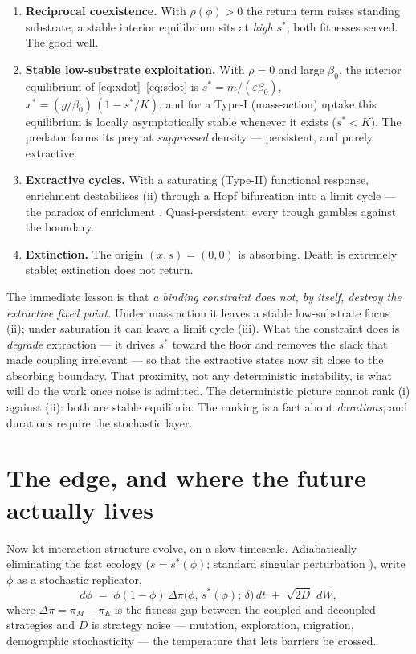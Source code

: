 \documentclass[11pt]{article}
\theoremstyle{plain}
\theoremstyle{definition}
\begin{document}
\begin{enumerate}[label=(\roman*)]
\item \textbf{Reciprocal coexistence.} With $\rho(\phi) > 0$ the return term raises standing substrate; a stable interior equilibrium sits at \emph{high} $s^\ast$, both fitnesses served. The good well.
\item \textbf{Stable low-substrate exploitation.} With $\rho = 0$ and large $\beta_0$, the interior equilibrium of \eqref{eq:xdot}--\eqref{eq:sdot} is $s^\ast = m/(\varepsilon\beta_0)$, $x^\ast = (g/\beta_0)\,(1 - s^\ast/K)$, and for a Type-I (mass-action) uptake this equilibrium is locally asymptotically stable whenever it exists ($s^\ast < K$). The predator farms its prey at \emph{suppressed} density --- persistent, and purely extractive.
\item \textbf{Extractive cycles.} With a saturating (Type-II) functional response, enrichment destabilises (ii) through a Hopf bifurcation into a limit cycle --- the paradox of enrichment \cite{rosenzweig1971}. Quasi-persistent: every trough gambles against the boundary.
\item \textbf{Extinction.} The origin $(x,s) = (0,0)$ is absorbing. Death is extremely stable; extinction does not return.
\end{enumerate}

The immediate lesson is that \emph{a binding constraint does not, by itself, destroy the extractive fixed point.} Under mass action it leaves a stable low-substrate focus (ii); under saturation it can leave a limit cycle (iii). What the constraint does is \emph{degrade} extraction --- it drives $s^\ast$ toward the floor and removes the slack that made coupling irrelevant --- so that the extractive states now sit close to the absorbing boundary. That proximity, not any deterministic instability, is what will do the work once noise is admitted. The deterministic picture cannot rank (i) against (ii): both are stable equilibria. The ranking is a fact about \emph{durations}, and durations require the stochastic layer.

\section{The edge, and where the future actually lives}
\label{sec:edge}

Now let interaction structure evolve, on a slow timescale. Adiabatically eliminating the fast ecology ($s = s^\ast(\phi)$; standard singular perturbation \cite{kuehn2015}), write $\phi$ as a stochastic replicator,
\begin{equation}
d\phi \;=\; \phi(1-\phi)\,\Delta\pi\!\big(\phi,\, s^\ast(\phi);\,\delta\big)\,dt \;+\; \sqrt{2D}\,\,dW,
\label{eq:replicator}
\end{equation}
where $\Delta\pi = \pi_{M} - \pi_{E}$ is the fitness gap between the coupled and decoupled strategies and $D$ is strategy noise --- mutation, exploration, migration, demographic stochasticity --- the temperature that lets barriers be crossed.
\end{document}
